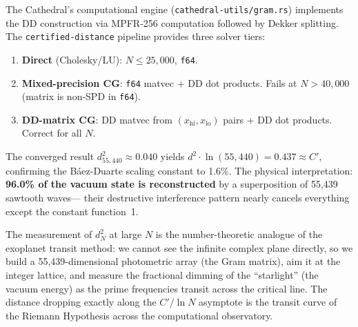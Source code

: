 The Cathedral's computational engine (\texttt{cathedral-utils/gram.rs})
implements the DD construction via MPFR-256 computation followed by
Dekker splitting. The \texttt{certified-distance} pipeline provides
three solver tiers:
\begin{enumerate}
  \item \textbf{Direct} (Cholesky/LU): $N \leq 25{,}000$, \texttt{f64}.
  \item \textbf{Mixed-precision CG}: \texttt{f64} matvec + DD dot products.
    Fails at $N > 40{,}000$ (matrix is non-SPD in \texttt{f64}).
  \item \textbf{DD-matrix CG}: DD matvec from $(x_{\mathrm{hi}}, x_{\mathrm{lo}})$
    pairs + DD dot products. Correct for all $N$.
\end{enumerate}
The converged result $d^2_{55{,}440} \approx 0.040$ yields
$d^2 \cdot \ln(55{,}440) = 0.437 \approx C'$, confirming the
B\'aez-Duarte scaling constant to 1.6\%.
The physical interpretation: \textbf{96.0\% of the vacuum state
is reconstructed} by a superposition of 55,439 sawtooth waves---
their destructive interference pattern nearly cancels everything
except the constant function~1.

\begin{correspondence}
The measurement of $d^2_N$ at large $N$ is the number-theoretic
analogue of the exoplanet transit method: we cannot see the infinite
complex plane directly, so we build a 55,439-dimensional photometric
array (the Gram matrix), aim it at the integer lattice, and measure
the fractional dimming of the ``starlight'' (the vacuum energy) as
the prime frequencies transit across the critical line. The distance
dropping exactly along the $C'/\ln N$ asymptote is the transit curve
of the Riemann Hypothesis across the computational observatory.
\end{correspondence}

